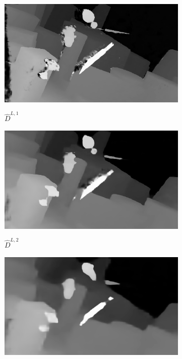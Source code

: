 \documentclass[10pt]{article}
\begin{document}
\begin{figure}[t]
{\begin{subfigure}[b]{0.28\textwidth}
        \includegraphics[width=\textwidth]{paper/latex/figures/pred_0.png}\\
        \vspace{-15pt}                
        \caption{$\hat{D}^{L,1}$}
    \end{subfigure} 
    \hspace{0.001cm} 
    \begin{subfigure}[b]{0.28\textwidth}
        \includegraphics[width=\textwidth]{paper/latex/figures/pred_1.png}\\
        \vspace{-15pt}      
        \caption{$\hat{D}^{L,2}$}
    \end{subfigure} 
    \hspace{0.001cm} 
    \begin{subfigure}[b]{0.28\textwidth}
        \includegraphics[width=\textwidth]{paper/latex/figures/pred_2.png}\\

\end{subfigure}}
\end{figure}
\end{document}

